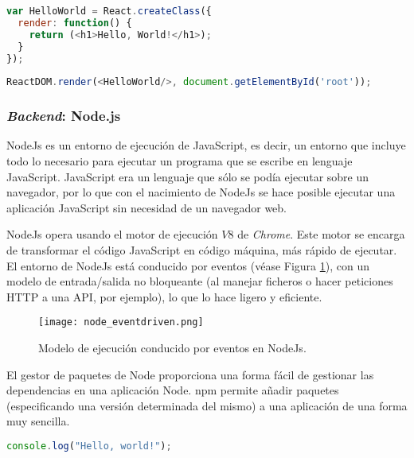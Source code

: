 \begin{lstlisting}[language=JavaScript,captionpos=t,caption={\textbf{\textit{Hello world} usando React.}},label={lst:reactHelloWorld}]
var HelloWorld = React.createClass({    
  render: function() {    
    return (<h1>Hello, World!</h1>);    
  }    
});    
    
ReactDOM.render(<HelloWorld/>, document.getElementById('root'));
\end{lstlisting}

\subsubsection{\textit{Backend}: Node.js}

NodeJs es un entorno de ejecución de JavaScript, es decir, un entorno que incluye todo lo necesario para ejecutar un programa que se escribe en lenguaje JavaScript. JavaScript era un lenguaje que sólo se podía ejecutar sobre un navegador, por lo que con el nacimiento de NodeJs se hace posible ejecutar una aplicación JavaScript sin necesidad de un navegador web.

NodeJs opera usando el motor de ejecución $V8$ de \textit{Chrome}. Este motor se encarga de transformar el código JavaScript en código máquina, más rápido de ejecutar. El entorno de NodeJs está conducido por eventos (véase Figura \ref{fig:nodeEventDriven}), con un modelo de entrada/salida no bloqueante (al manejar ficheros o hacer peticiones \ac{HTTP} a una \ac{API}, por ejemplo), lo que lo hace ligero y eficiente.

\begin{figure}[!h]
\begin{center}
\texttt{[image: node\_eventdriven.png]}
\caption{Modelo de ejecución conducido por eventos en NodeJs.}
\label{fig:nodeEventDriven}
\end{center}
\end{figure}

El gestor de paquetes de Node  proporciona una forma fácil de gestionar las dependencias en una aplicación Node. \ac{npm} permite añadir paquetes (especificando una versión determinada del mismo) a una aplicación de una forma muy sencilla. 

\begin{lstlisting}[language=JavaScript,captionpos=t,caption={\textbf{\textit{Hello world} en NodeJs.}},label={lst:nodeHelloWorld}]
console.log("Hello, world!");
\end{lstlisting}

